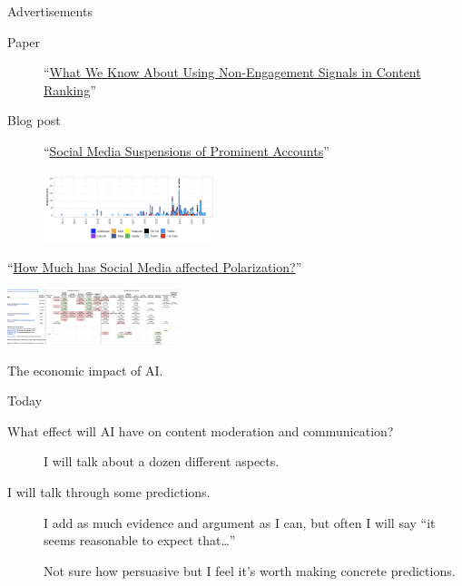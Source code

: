 \documentclass[
  10pt,
  ignorenonframetext,
]{beamer}
\providecommand{\tightlist}{%
  \setlength{\itemsep}{0pt}\setlength{\parskip}{0pt}}\usepackage{longtable,booktabs,array}
\begin{document}
\begin{frame}{Advertisements}
\label{advertisements}
\begin{description}
\item[Paper]
``\href{https://arxiv.org/abs/2402.06831}{What We Know About Using
Non-Engagement Signals in Content Ranking}''
\end{description}

\begin{description}
\item[Blog post]
``\href{https://tecunningham.github.io/posts/2023-01-31-social-media-suspensions-data.html}{Social
Media Suspensions of Prominent Accounts}''

\includegraphics[width=5cm,height=\textheight]{images/2024-11-11-14-54-12.png}
\end{description}

\begin{description}
\tightlist
\item[Blog post]
``\href{https://tecunningham.github.io/posts/2023-07-27-meta-2020-elections-experiments.html}{How
Much has Social Media affected Polarization?}''

\includegraphics[width=5cm,height=\textheight]{images/2024-11-11-14-57-56.png}
\item[OpenAI work]
The economic impact of AI.
\end{description}
\end{frame}

\begin{frame}{Today}
\label{today}
\begin{description}
\item[What effect will AI have on content moderation and communication?]
I will talk about a dozen different aspects.
\end{description}

\vspace{2cm}

\begin{description}
\item[I will talk through some predictions.]
I add as much evidence and argument as I can, but often I will say ``it
seems reasonable to expect that\ldots{}''

Not sure how persuasive but I feel it's worth making concrete
predictions.
\end{description}
\end{frame}
\end{document}
